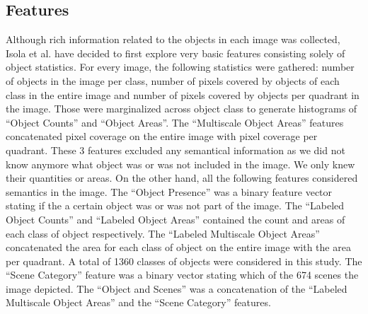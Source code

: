 \documentclass[10pt,twocolumn,letterpaper]{article}
\begin{document}
\subsection{Features}
Although rich information related to the objects in each image was collected, Isola et al. have decided to first explore very basic features consisting solely of object statistics. For every image, the following statistics were gathered: number of objects in the image per class, number of pixels covered by objects of each class in the entire image and number of pixels covered by objects per quadrant in the image. Those were marginalized across object class to generate histograms of ``Object Counts'' and ``Object Areas''. The ``Multiscale Object Areas'' features concatenated pixel coverage on the entire image with pixel coverage per quadrant. These 3 features excluded any semantical information as we did not know anymore what object was or was not included in the image. We only knew their quantities or areas. On the other hand, all the following features considered semantics in the image. The ``Object Presence'' was a binary feature vector stating if the a certain object was or was not part of the image. The ``Labeled Object Counts'' and ``Labeled Object Areas'' contained the count and areas of each class of object respectively. The ``Labeled Multiscale Object Areas'' concatenated the area for each class of object on the entire image with the area per quadrant. A total of 1360 classes of objects were considered in this study. The ``Scene Category'' feature was a binary vector stating which of the 674 scenes the image depicted. The ``Object and Scenes'' was a concatenation of the ``Labeled Multiscale Object Areas'' and the ``Scene Category'' features.
\end{document}
